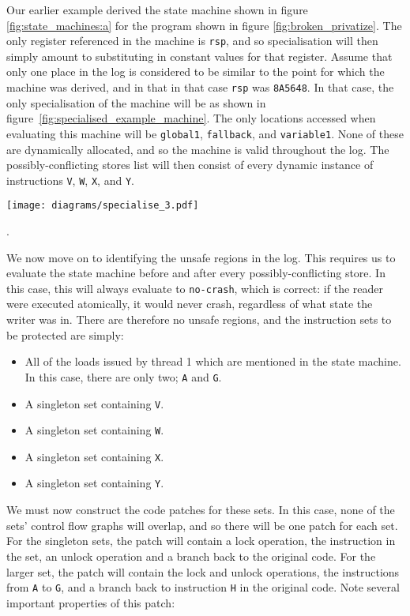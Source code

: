 \documentclass[10pt,twocolumn,preprint,natbib,authoryear]{sigplanconf}
\begin{document}
Our earlier example derived the state machine shown in figure
\ref{fig:state_machines:a} for the program shown in figure
\ref{fig:broken_privatize}.  The only register referenced in the
machine is \verb|rsp|, and so specialisation will then simply amount
to substituting in constant values for that register.  Assume that
only one place in the log is considered to be similar to the point for
which the machine was derived, and in that in that case \verb|rsp| was
\verb|8A5648|.  In that case, the only specialisation of the machine
will be as shown in figure~\ref{fig:specialised_example_machine}.  The
only locations accessed when evaluating this machine will be
\verb|global1|, \verb|fallback|, and \verb|variable1|.  None of these
are dynamically allocated, and so the machine is valid throughout the
log.  The possibly-conflicting stores list will then consist of every
dynamic instance of instructions \verb|V|, \verb|W|, \verb|X|, and
\verb|Y|.

\begin{figure*}[thb]
\texttt{[image: diagrams/specialise\_3.pdf]}
\caption{Results of specialising figure~\ref{fig:state_machines:a}}
\label{fig:specialised_example_machine}
\end{figure*}.

We now move on to identifying the unsafe regions in the log.  This
requires us to evaluate the state machine before and after every
possibly-conflicting store.  In this case, this will always evaluate
to \verb|no-crash|, which is correct: if the reader were executed
atomically, it would never crash, regardless of what state the writer
was in.  There are therefore no unsafe regions, and the instruction
sets to be protected are simply:

\begin{itemize}
\item All of the loads issued by thread 1 which are mentioned in the
  state machine.  In this case, there are only two; \verb|A| and
  \verb|G|.
\item A singleton set containing \verb|V|.
\item A singleton set containing \verb|W|.
\item A singleton set containing \verb|X|.
\item A singleton set containing \verb|Y|.
\end{itemize}

We must now construct the code patches for these sets.  In this case,
none of the sets' control flow graphs will overlap, and so there will
be one patch for each set.  For the singleton sets, the patch will
contain a lock operation, the instruction in the set, an unlock
operation and a branch back to the original code.  For the larger set,
the patch will contain the lock and unlock operations, the
instructions from \verb|A| to \verb|G|, and a branch back to
instruction \verb|H| in the original code.  Note several important
properties of this patch:
\end{document}
